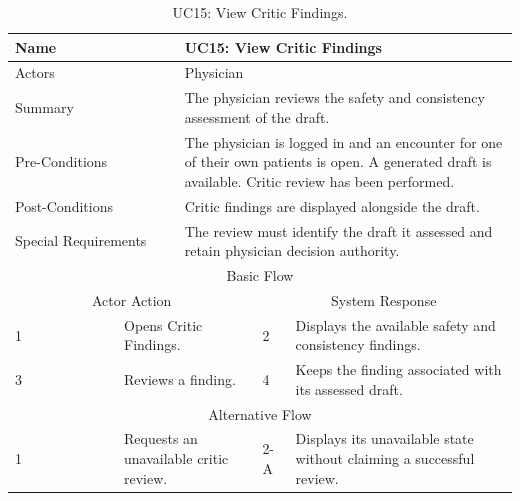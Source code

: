 \begin{table}[htbp]
\centering
\small
\caption{UC15: View Critic Findings.}
\label{tab:kashaf:uc15}
\begin{tabular}{|p{}|p{}|p{}|p{}|p{}|}
\hline
\multicolumn{2}{|p{\dimexpr0.225\textwidth+2\tabcolsep+\arrayrulewidth\relax}|}{Name} & \multicolumn{3}{p{\dimexpr0.575\textwidth+4\tabcolsep+2\arrayrulewidth\relax}|}{UC15: View Critic Findings} \\ \hline
\multicolumn{2}{|p{\dimexpr0.225\textwidth+2\tabcolsep+\arrayrulewidth\relax}|}{Actors} & \multicolumn{3}{p{\dimexpr0.575\textwidth+4\tabcolsep+2\arrayrulewidth\relax}|}{Physician} \\ \hline
\multicolumn{2}{|p{\dimexpr0.225\textwidth+2\tabcolsep+\arrayrulewidth\relax}|}{Summary} & \multicolumn{3}{p{\dimexpr0.575\textwidth+4\tabcolsep+2\arrayrulewidth\relax}|}{The physician reviews the safety and consistency assessment of the draft.} \\ \hline
\multicolumn{2}{|p{\dimexpr0.225\textwidth+2\tabcolsep+\arrayrulewidth\relax}|}{Pre-Conditions} & \multicolumn{3}{p{\dimexpr0.575\textwidth+4\tabcolsep+2\arrayrulewidth\relax}|}{The physician is logged in and an encounter for one of their own patients is open. A generated draft is available. Critic review has been performed.} \\ \hline
\multicolumn{2}{|p{\dimexpr0.225\textwidth+2\tabcolsep+\arrayrulewidth\relax}|}{Post-Conditions} & \multicolumn{3}{p{\dimexpr0.575\textwidth+4\tabcolsep+2\arrayrulewidth\relax}|}{Critic findings are displayed alongside the draft.} \\ \hline
\multicolumn{2}{|p{\dimexpr0.225\textwidth+2\tabcolsep+\arrayrulewidth\relax}|}{Special Requirements} & \multicolumn{3}{p{\dimexpr0.575\textwidth+4\tabcolsep+2\arrayrulewidth\relax}|}{The review must identify the draft it assessed and retain physician decision authority.} \\ \hline
\multicolumn{5}{|c|}{Basic Flow} \\ \hline
\multicolumn{3}{|c|}{Actor Action} & \multicolumn{2}{c|}{System Response} \\ \hline
1 & \multicolumn{2}{p{\dimexpr0.37\textwidth+2\tabcolsep+\arrayrulewidth\relax}|}{Opens Critic Findings.} & 2 & Displays the available safety and consistency findings. \\ \hline
3 & \multicolumn{2}{p{\dimexpr0.37\textwidth+2\tabcolsep+\arrayrulewidth\relax}|}{Reviews a finding.} & 4 & Keeps the finding associated with its assessed draft. \\ \hline
\multicolumn{5}{|c|}{Alternative Flow} \\ \hline
1 & \multicolumn{2}{p{\dimexpr0.37\textwidth+2\tabcolsep+\arrayrulewidth\relax}|}{Requests an unavailable critic review.} & 2-A & Displays its unavailable state without claiming a successful review. \\ \hline
\end{tabular}
\end{table}

